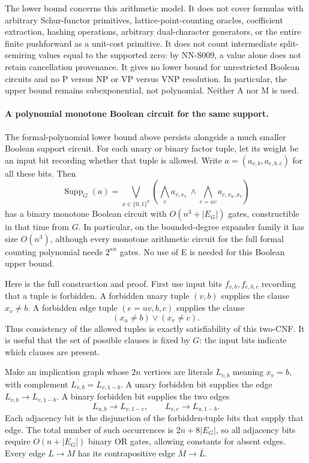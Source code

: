 The lower bound concerns this arithmetic model. It does
not cover formulas with arbitrary Schur-functor primitives,
lattice-point-counting oracles, coefficient extraction,
hashing operations, arbitrary dual-character generators, or
the entire finite pushforward as a unit-cost primitive. It does not count intermediate
split-semiring values equal to the supported zero: by
NN-S009, a value alone does not retain cancellation
provenance. It gives no lower bound for unrestricted
Boolean circuits and no P versus NP or VP versus VNP
resolution. In particular, the upper bound remains
subexponential, not polynomial. Neither A nor M is used.


\paragraph{A polynomial monotone Boolean circuit for the same support.}
The formal-polynomial lower bound above persists alongside a much smaller
Boolean support circuit.  For each unary or binary factor tuple, let its
weight be an input bit recording whether that tuple is allowed.  Write
$a=(a_{v,b},a_{e,b,c})$ for all these bits.  Then
\[
 \operatorname{Supp}_G(a)=
 \bigvee_{x\in\{0,1\}^V}
       \left(\bigwedge_v a_{v,x_v}\ \wedge\!
                         \bigwedge_{e=uv}a_{e,x_u,x_v}\right)
\]
has a binary monotone Boolean circuit with $O(n^3+|E_G|)$ gates,
constructible in that time from $G$.  In particular, on the bounded-degree
expander family it has size $O(n^3)$, although every monotone arithmetic
circuit for the full formal counting polynomial needs $2^{\kappa n}$
gates.  No use of E is needed for this Boolean upper bound.

Here is the full construction and proof.  First use input bits
$f_{v,b},f_{e,b,c}$ recording that a tuple is forbidden.  A forbidden
unary tuple $(v,b)$ supplies the clause $x_v\ne b$.  A forbidden edge
tuple $(e=uv,b,c)$ supplies the clause
\[
                       (x_u\ne b)\vee(x_v\ne c).
\]
Thus consistency of the allowed tuples is exactly satisfiability of
this two-CNF.  It is useful that the set of possible clauses is fixed
by $G$: the input bits indicate which clauses are present.

Make an implication graph whose $2n$ vertices are literals
$L_{v,b}$ meaning $x_v=b$, with complement
$\overline{L_{v,b}}=L_{v,1-b}$.  A unary forbidden bit supplies
the edge $L_{v,b}\to L_{v,1-b}$.  A binary forbidden bit supplies
the two edges
\[
 L_{u,b}\longrightarrow L_{v,1-c},\qquad
 L_{v,c}\longrightarrow L_{u,1-b}.
\]
Each adjacency bit is the disjunction of the forbidden-tuple bits
that supply that edge.  The total number of such occurrences is
$2n+8|E_G|$, so all adjacency bits require $O(n+|E_G|)$ binary
OR gates, allowing constants for absent edges.  Every edge
$L\to M$ has its contrapositive edge
$\overline M\to\overline L$.

